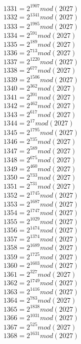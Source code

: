 \documentclass[12pt, letterpaper]{article}
\begin{document}
\begin{itemize}
\begin{multicols}{3}
$1331= 2^{1907} mod (2027)$\\
$1332= 2^{1341} mod (2027)$\\
$1333= 2^{1985} mod (2027)$\\
$1334= 2^{591} mod (2027)$\\
$1335= 2^{189} mod (2027)$\\
$1336= 2^{713} mod (2027)$\\
$1337= 2^{1220} mod (2027)$\\
$1338= 2^{677} mod (2027)$\\
$1339= 2^{1506} mod (2027)$\\
$1340= 2^{362} mod (2027)$\\
$1341= 2^{201} mod (2027)$\\
$1342= 2^{462} mod (2027)$\\
$1343= 2^{617} mod (2027)$\\
$1344= 2^{17} mod (2027)$\\
$1345= 2^{1795} mod (2027)$\\
$1346= 2^{735} mod (2027)$\\
$1347= 2^{589} mod (2027)$\\
$1348= 2^{675} mod (2027)$\\
$1349= 2^{460} mod (2027)$\\
$1350= 2^{733} mod (2027)$\\
$1351= 2^{731} mod (2027)$\\
$1352= 2^{1745} mod (2027)$\\
$1353= 2^{1687} mod (2027)$\\
$1354= 2^{1747} mod (2027)$\\
$1355= 2^{1029} mod (2027)$\\
$1356= 2^{1474} mod (2027)$\\
$1357= 2^{1374} mod (2027)$\\
$1358= 2^{1689} mod (2027)$\\
$1359= 2^{1725} mod (2027)$\\
$1360= 2^{1603} mod (2027)$\\
$1361= 2^{327} mod (2027)$\\
$1362= 2^{1749} mod (2027)$\\
$1363= 2^{1416} mod (2027)$\\
$1364= 2^{783} mod (2027)$\\
$1365= 2^{1838} mod (2027)$\\
$1366= 2^{1031} mod (2027)$\\
$1367= 2^{525} mod (2027)$\\
$1368= 2^{1631} mod (2027)$\\

\end{multicols}
\end{itemize}
\end{document}
